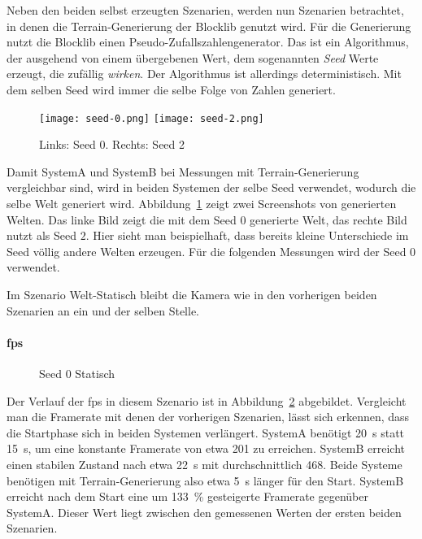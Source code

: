 Neben den beiden selbst erzeugten Szenarien, werden nun Szenarien betrachtet, in denen die Terrain-Generierung der Blocklib genutzt wird. Für die Generierung nutzt die Blocklib einen Pseudo-Zufallszahlengenerator. Das ist ein Algorithmus, der ausgehend von einem übergebenen Wert, dem sogenannten \emph{Seed} Werte erzeugt, die zufällig \emph{wirken}. Der Algorithmus ist allerdings deterministisch. Mit dem selben Seed wird immer die selbe Folge von Zahlen generiert.

\begin{figure}
	\centering
	\texttt{[image: seed-0.png]}
	\hfill
	\texttt{[image: seed-2.png]}
	\caption{Links: Seed 0. Rechts: Seed 2}\label{fig:static}
\end{figure}
Damit SystemA und SystemB bei Messungen mit Terrain-Generierung vergleichbar sind, wird in beiden Systemen der selbe Seed verwendet, wodurch die selbe Welt generiert wird. Abbildung~\ref{fig:static} zeigt zwei Screenshots von generierten Welten. Das linke Bild zeigt die mit dem Seed $0$ generierte Welt, das rechte Bild nutzt als Seed $2$. Hier sieht man beispielhaft, dass bereits kleine Unterschiede im Seed völlig andere Welten erzeugen. Für die folgenden Messungen wird der Seed $0$ verwendet. 

Im Szenario Welt-Statisch bleibt die Kamera wie in den vorherigen beiden Szenarien an ein und der selben Stelle.



\paragraph{\ac{fps}}
\begin{figure}[!htbp]
	\caption{Seed 0 Statisch}\label{fig:seed-0-static-fps}
\end{figure}
Der Verlauf der \ac{fps} in diesem Szenario ist in Abbildung~\ref{fig:seed-0-static-fps} abgebildet. Vergleicht man die Framerate mit denen der vorherigen Szenarien, lässt sich erkennen, dass die Startphase sich in beiden Systemen verlängert. SystemA benötigt \SI{20}{\second} statt \SI{15}{\second}, um eine konstante Framerate von etwa \SI{201}{\fps} zu erreichen. SystemB erreicht einen stabilen Zustand nach etwa \SI{22}{\second} mit durchschnittlich \SI{468}{\fps}.
Beide Systeme benötigen mit Terrain-Generierung also etwa \SI{5}{\second} länger für den Start. SystemB erreicht nach dem Start eine um \SI{133}{\percent} gesteigerte Framerate gegenüber SystemA. Dieser Wert liegt zwischen den gemessenen Werten der ersten beiden Szenarien.

